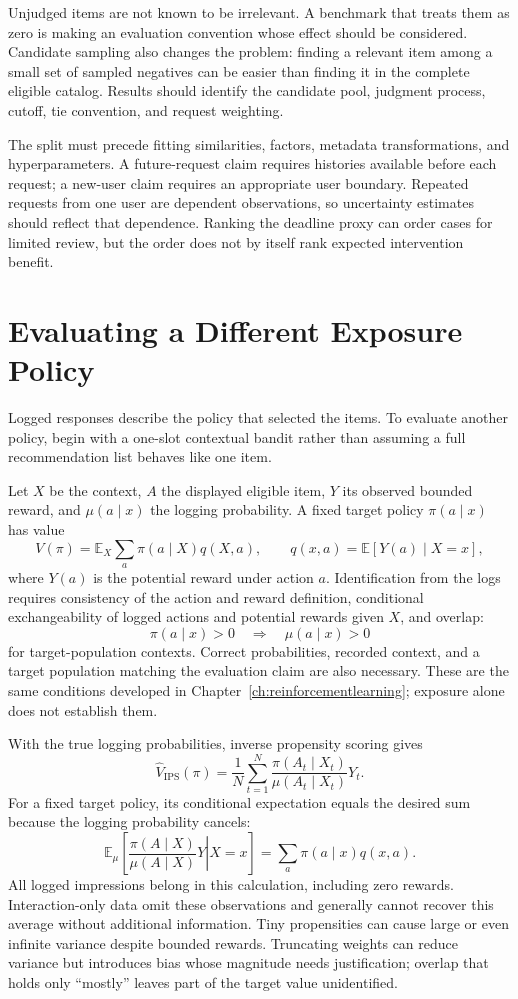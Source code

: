 Unjudged items are not known to be irrelevant. A benchmark that treats them as zero is making an evaluation convention whose effect should be considered. Candidate sampling also changes the problem: finding a relevant item among a small set of sampled negatives can be easier than finding it in the complete eligible catalog. Results should identify the candidate pool, judgment process, cutoff, tie convention, and request weighting.

The split must precede fitting similarities, factors, metadata transformations, and hyperparameters. A future-request claim requires histories available before each request; a new-user claim requires an appropriate user boundary. Repeated requests from one user are dependent observations, so uncertainty estimates should reflect that dependence. Ranking the deadline proxy can order cases for limited review, but the order does not by itself rank expected intervention benefit.

\section{Evaluating a Different Exposure Policy}

Logged responses describe the policy that selected the items. To evaluate another policy, begin with a one-slot contextual bandit rather than assuming a full recommendation list behaves like one item.

Let $X$ be the context, $A$ the displayed eligible item, $Y$ its observed bounded reward, and $\mu(a\mid x)$ the logging probability. A fixed target policy $\pi(a\mid x)$ has value
\[
V(\pi)=\mathbb E_X\sum_a\pi(a\mid X)q(X,a),
\qquad q(x,a)=\mathbb E[Y(a)\mid X=x],
\]
where $Y(a)$ is the potential reward under action $a$. Identification from the logs requires consistency of the action and reward definition, conditional exchangeability of logged actions and potential rewards given $X$, and overlap:
\[
\pi(a\mid x)>0\quad\Longrightarrow\quad\mu(a\mid x)>0
\]
for target-population contexts. Correct probabilities, recorded context, and a target population matching the evaluation claim are also necessary. These are the same conditions developed in Chapter~\ref{ch:reinforcementlearning}; exposure alone does not establish them.

With the true logging probabilities, inverse propensity scoring gives
\[
\widehat V_{\mathrm{IPS}}(\pi)=\frac1N\sum_{t=1}^N
\frac{\pi(A_t\mid X_t)}{\mu(A_t\mid X_t)}Y_t.
\]
For a fixed target policy, its conditional expectation equals the desired sum because the logging probability cancels:
\[
\mathbb E_\mu\left[\left.\frac{\pi(A\mid X)}{\mu(A\mid X)}Y\right|X=x\right]
=\sum_a\pi(a\mid x)q(x,a).
\]
All logged impressions belong in this calculation, including zero rewards. Interaction-only data omit these observations and generally cannot recover this average without additional information. Tiny propensities can cause large or even infinite variance despite bounded rewards. Truncating weights can reduce variance but introduces bias whose magnitude needs justification; overlap that holds only ``mostly'' leaves part of the target value unidentified.


